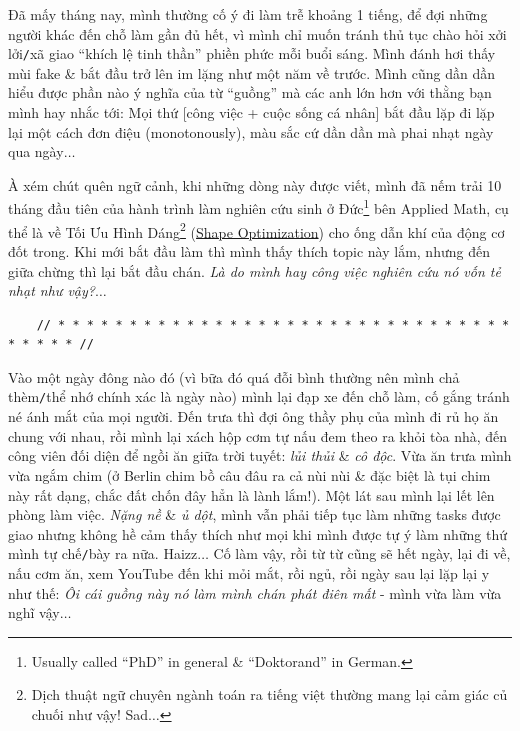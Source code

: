 \documentclass[12pt]{article}
\begin{document}
\noindent
{} Đã mấy tháng nay, mình thường cố ý đi làm trễ khoảng 1 tiếng, để đợi những người khác đến chỗ làm gần đủ hết, vì mình chỉ muốn tránh thủ tục chào hỏi xởi lởi{\tt/}xã giao ``khích lệ tinh thần'' phiền phức mỗi buổi sáng. Mình đánh hơi thấy mùi fake \& bắt đầu trở lên im lặng như một năm về trước. Mình cũng dần dần hiểu được phần nào ý nghĩa của từ ``guồng'' mà các anh lớn hơn với thằng bạn mình hay nhắc tới: Mọi thứ [công việc + cuộc sống cá nhân] bắt đầu lặp đi lặp lại một cách đơn điệu (monotonously), màu sắc cứ dần dần mà phai nhạt ngày qua ngày$\ldots$

À xém chút quên ngữ cảnh, khi những dòng này được viết, mình đã nếm trải 10 tháng đầu tiên của hành trình làm nghiên cứu sinh ở Đức\footnote{Usually called ``PhD'' in general \& ``Doktorand'' in German.} bên Applied Math, cụ thể là về Tối Ưu Hình Dáng\footnote{Dịch thuật ngữ chuyên ngành toán ra tiếng việt thường mang lại cảm giác củ chuối như vậy! Sad$\ldots$} (\href{https://en.wikipedia.org/wiki/Shape_optimization}{Shape Optimization}) cho ống dẫn khí của động cơ đốt trong. Khi mới bắt đầu làm thì mình thấy thích topic này lắm, nhưng đến giữa chừng thì lại bắt đầu chán. {\it Là do mình hay công việc nghiên cứu nó vốn tẻ nhạt như vậy?}$\ldots$

\begin{verbatim}
	// * * * * * * * * * * * * * * * * * * * * * * * * * * * * * * * * * * * * * //
\end{verbatim}

\noindent
{} Vào một ngày đông nào đó (vì bữa đó quá đỗi bình thường nên mình chả thèm{\tt/}thể nhớ chính xác là ngày nào) mình lại đạp xe đến chỗ làm, cố gắng tránh né ánh mắt của mọi người. Đến trưa thì đợi ông thầy phụ của mình đi rủ họ ăn chung với nhau, rồi mình lại xách hộp cơm tự nấu đem theo ra khỏi tòa nhà, đến công viên đối diện để ngồi ăn giữa trời tuyết: {\it lủi thủi} \& {\it cô độc}. Vừa ăn trưa mình vừa ngắm chim (ở Berlin chim bồ câu đâu ra cả nùi nùi \& đặc biệt là tụi chim này rất dạng, chắc đất chốn đây hẳn là lành lắm!). Một lát sau mình lại lết lên phòng làm việc. {\it Nặng nề} \& {\it ủ dột}, mình vẫn phải tiếp tục làm những tasks được giao nhưng không hề cảm thấy thích như mọi khi mình được tự ý làm những thứ mình tự chế{\tt/}bày ra nữa. Haizz$\ldots$ Cố làm vậy, rồi từ từ cũng sẽ hết ngày, lại đi về, nấu cơm ăn, xem YouTube đến khi mỏi mắt, rồi ngủ, rồi ngày sau lại lặp lại y như thế: {\it Ôi cái guồng này nó làm mình chán phát điên mất} - mình vừa làm vừa nghĩ vậy$\ldots$
\end{document}
